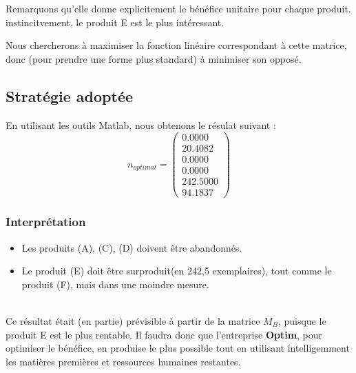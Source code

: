 Remarquons qu'elle donne explicitement le bénéfice unitaire pour chaque produit. instincitvement, le produit E est 
le plus intéressant.

Nous chercherons à maximiser la fonction linéaire correspondant à cette matrice, donc (pour prendre une forme plus standard)
à minimiser son opposé.

\subsection{Stratégie adoptée}

En utilisant les outils Matlab, nous obtenons le résulat suivant :
\[
	n_{optimal} = 
\begin{pmatrix}
    0.0000 \\
   20.4082 \\
    0.0000 \\
    0.0000 \\
  242.5000 \\
   94.1837
\end{pmatrix}
\]
\begin{center}
\end{center}

\subsubsection{Interprétation}
\begin{itemize}
	\item Les produits (A), (C), (D) doivent être abandonnés.
	\item Le produit (E) doit être \og surproduit\fg (en 242,5 exemplaires), tout comme le produit (F), mais dans 
	une moindre mesure.
\end{itemize}
~\\
Ce résultat était (en partie) prévisible à partir de la matrice $M_{B}$, puisque le produit E est le plus rentable.
Il faudra donc que l'entreprise \textbf{Optim}, pour optimiser le bénéfice, en produise le plus possible tout en 
utilisant intelligemment les matières premières et ressources humaines restantes.
